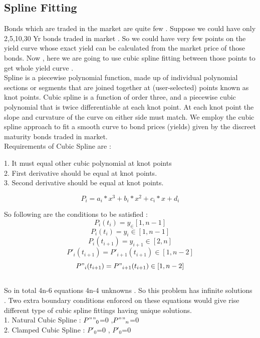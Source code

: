 \documentclass[a4paper]{article}
\begin{document}
 \subsection{Spline Fitting}
  Bonds which are traded in the market are quite few . Suppose  we could have only 2,5,10,30 Yr bonds traded in market . So we could have very few points on the yield curve whose exact yield can be calculated from the market price of those bonds. Now , here we are going to use cubic spline fitting between those points to
  get whole yield curve . \\ 
   Spline  is a piecewise polynomial function, made up of individual polynomial sections  or  segments  that  are
   joined  together  at  (user-selected)  points  known as knot
   points.  Cubic spline is a function of  order  three,  and  a piecewise  cubic  polynomial  that  is  twice  differentiable at  each  knot point. At each knot point the slope and curvature of the curve on either side must match. We employ  the  cubic  spline  approach  to  fit  a  smooth curve  to  bond  prices  (yields)  given  by  the discreet maturity bonds traded in market.\\
   Requirements of Cubic Spline are : \\
   \begin{center}
   1. It must equal other cubic polynomial at knot points \\
   2. First derivative should be equal at knot points. \\
   3. Second derivative should be equal at knot points.
  \end{center}
   
   \[ P_i = a_i*x^3 + b_i*x^2 + c_i*x + d_i \]
   
   
   So following are the conditions to be satisfied : 
   \[ P_i(t_i)=y_ \in  [1 , n-1] \] 
   \[ P_i(t_i)=y_i \in  [1 , n-1] \]            
  \[ P_i(t_{i+1})=y_{i+1} \in [2,n]  \]
 \[ P'_i(t_{i+1})=P'_{i+1}(t_{i+1}) \in [1, n-2] \]
 \[  P"_i(t_{i+1})=P"_{i+1}(t_{i+1}) \in [1,n-2] \] \\
 
 
  
  So in total 4n-6 equations 4n-4 unknowns . So this problem has infinite solutions .
  Two extra boundary conditions enforced on these equations would give rise different type of cubic spline fittings having unique solutions. \\
  
  1. Natural Cubic Spline : $P""_0$=0 ,$P""_n$=0 \\
  2. Clamped Cubic Spline : $P'_0$=0 , $P'_0$=0 \\
  
\end{document}
